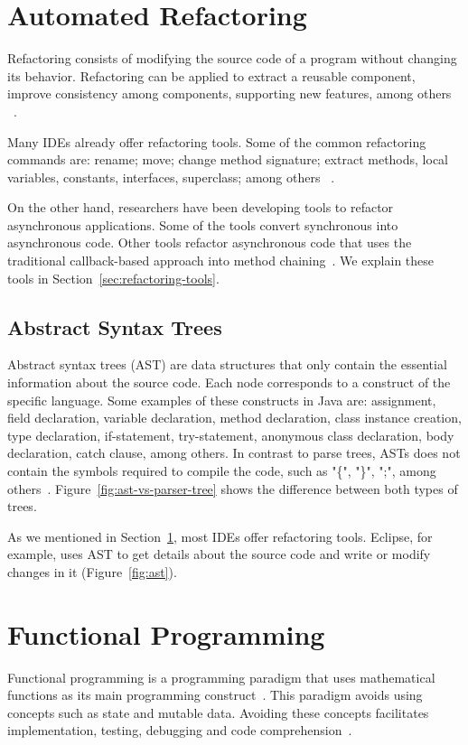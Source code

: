\documentclass[type=bsc,accentcolor=tud9c]{tudthesis}
\begin{document}
\section{Automated Refactoring}
\label{sec:automated-refactoring}
Refactoring consists of modifying the source code of a program without changing its behavior. Refactoring can be applied to extract a reusable component, improve consistency among components, supporting new features, among others ~\cite{thesisRefactoringFrameworks}. 

Many IDEs already offer refactoring tools. Some of the common refactoring commands are: rename; move; change method signature; extract methods, local variables, constants, interfaces, superclass; among others ~\cite{eclipse, intelliJ}. 

On the other hand, researchers have been developing tools to refactor asynchronous applications. Some of the tools convert synchronous into asynchronous code. Other tools refactor asynchronous code that uses the traditional callback-based approach into method chaining~\cite{paperAsyncMobile, paperStudyRefactoring, thesisJavaScript, paperRetrofittingConcurrency}. We explain these tools in Section~\ref{sec:refactoring-tools}.

\subsection{Abstract Syntax Trees}
Abstract syntax trees (AST) are data structures that only contain the essential information about the source code. Each node corresponds to a construct of the specific language. Some examples of these constructs in Java are: assignment, field declaration, variable declaration, method declaration, class instance creation, type declaration, if-statement, try-statement, anonymous class declaration, body declaration, catch clause, among others. In contrast to parse trees, ASTs does not contain the symbols required to compile the code, such as "\{", "\}", ";", among others~\cite{bookAST}. Figure~\ref{fig:ast-vs-parser-tree} shows the difference between both types of trees.



As we mentioned in Section~\ref{sec:automated-refactoring}, most IDEs offer refactoring tools. Eclipse, for example, uses AST to get details about the source code and write or modify changes in it (Figure~\ref{fig:ast}).

\section{Functional Programming}
Functional programming is a programming paradigm that uses mathematical functions as its main programming construct~\cite{bookFunctionalProgramming}. This paradigm avoids using concepts such as state and mutable data. Avoiding these concepts facilitates implementation, testing, debugging and code comprehension~\cite{bookFunctionalProgrammingScala}.
\end{document}
